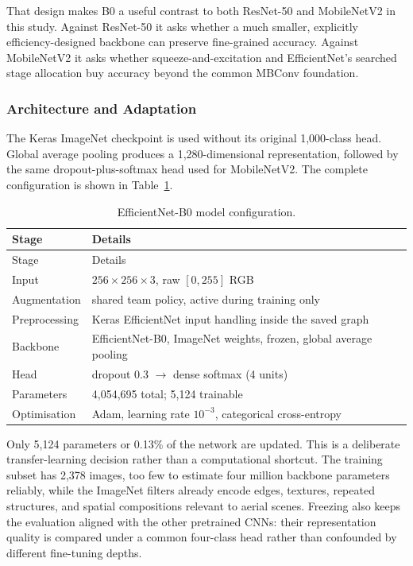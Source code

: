 \documentclass[11pt,twoside,a4paper]{article}
\begin{document}
That design makes B0 a useful contrast to both ResNet-50 and MobileNetV2 in this
study. Against ResNet-50 it asks whether a much smaller, explicitly
efficiency-designed backbone can preserve fine-grained accuracy. Against
MobileNetV2 it asks whether squeeze-and-excitation and EfficientNet's searched
stage allocation buy accuracy beyond the common MBConv foundation.

\subsubsection{Architecture and Adaptation}

The Keras ImageNet checkpoint is used without its original 1,000-class head.
Global average pooling produces a 1,280-dimensional representation, followed by
the same dropout-plus-softmax head used for MobileNetV2. The complete
configuration is shown in Table~\ref{tab:efficientnet-config}.

\small
\begin{longtable}{ll}
\caption{EfficientNet-B0 model configuration.}
\label{tab:efficientnet-config}\\

\toprule
Stage & Details \\
\midrule
\endfirsthead

\toprule
Stage & Details \\
\midrule
\endhead

\endfoot

\bottomrule
\endlastfoot

Input & $256 \times 256 \times 3$, raw $[0,255]$ RGB \\
Augmentation & shared team policy, active during training only \\
Preprocessing & Keras EfficientNet input handling inside the saved graph \\
Backbone & EfficientNet-B0, ImageNet weights, frozen, global average pooling \\
Head & dropout 0.3 $\rightarrow$ dense softmax (4 units) \\
Parameters & 4{,}054{,}695 total; 5{,}124 trainable \\
Optimisation & Adam, learning rate $10^{-3}$, categorical cross-entropy \\

\end{longtable}
\normalsize

Only 5,124 parameters or 0.13\% of the network are updated. This is a
deliberate transfer-learning decision rather than a computational shortcut. The
training subset has 2,378 images, too few to estimate four million backbone
parameters reliably, while the ImageNet filters already encode edges, textures,
repeated structures, and spatial compositions relevant to aerial scenes.
Freezing also keeps the evaluation aligned with the other pretrained CNNs:
their representation quality is compared under a common four-class head rather
than confounded by different fine-tuning depths.
\end{document}
